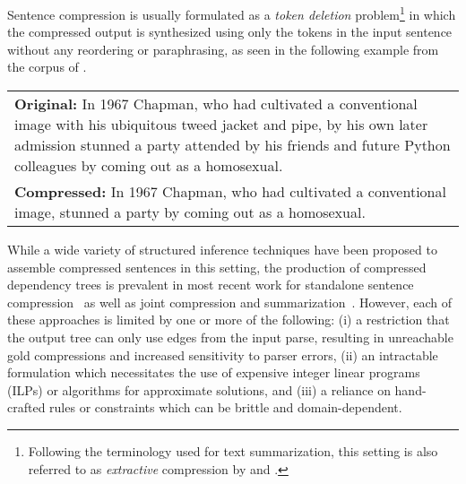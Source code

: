 \documentclass[11pt,a4paper]{article}
\begin{document}

Sentence compression is usually formulated as a \textit{token deletion}
problem\footnote{Following the terminology used for text
    summarization, this setting is also referred to as \emph{extractive}
    compression by  and .}
in which the compressed output is synthesized using only the
tokens in the input sentence without any reordering or paraphrasing,
as seen in the following example from the corpus of
.

\begin{tabular}{p{190pt}}
    \small\vspace{0pt}
\textbf{Original:} In 1967 Chapman, who had cultivated a
    conventional image with his ubiquitous tweed jacket and pipe, by his own
    later admission stunned a party attended by his friends and future Python
    colleagues by coming out as a homosexual.\\[4pt]
        \small
\textbf{Compressed:} In 1967 Chapman, who had cultivated a
conventional image, stunned a party by coming out as a homosexual.\\[4pt]
\end{tabular}
While a wide variety of structured inference techniques have been
proposed to
assemble compressed sentences in this setting, the production of
compressed dependency trees is prevalent in most recent work for
standalone sentence
compression~\cite{filippova08a,nomoto09,galanis10,thadani13a,filippova13,thadani14}
as well as joint compression and
summarization~\cite{martins09a,almeida13,qian13}. However, each of these
approaches is limited by one or more of the following: (i) a restriction
that the output tree can only use edges from the input parse,
resulting in unreachable gold compressions and increased sensitivity to
parser errors,
(ii) an intractable formulation which necessitates the use of expensive
integer linear programs (ILPs) or algorithms for approximate solutions,
and (iii) a reliance on hand-crafted rules or constraints which can be
brittle and domain-dependent.
\end{document}
